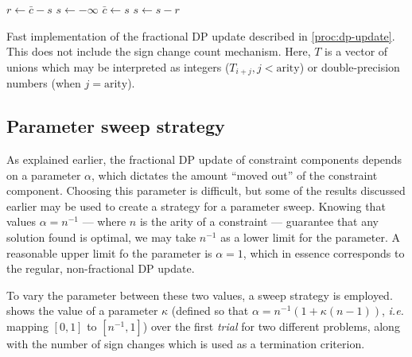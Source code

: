 \begin{algorithm}[tbp]
	\(r \leftarrow \bar{c} - s\) \;
	\(s \leftarrow -\infty\) \;
	\(\bar{c} \leftarrow s\) \;
	\(s \leftarrow s - r\) \;
	\caption{Fast implementation of the fractional DP update described in \cref{proc:dp-update}. This does not include the sign change count mechanism. Here, \(T\) is a vector of unions which may be interpreted as integers (\(T_{i+j}, j < \text{arity}\)) or double-precision numbers (when \(j = \text{arity}\)).}
	\label{alg:itm-maxsum-fast}
\end{algorithm}

\subsection{Parameter sweep strategy}
As explained earlier, the fractional DP update of constraint components depends on a parameter \(\alpha\), which dictates the amount \enquote{moved out} of the constraint component.
Choosing this parameter is difficult, but some of the results discussed earlier may be used to create a strategy for a parameter sweep.
Knowing that values \(\alpha=n^{-1}\) --- where \(n\) is the arity of a constraint --- guarantee that any solution found is optimal, we may take \(n^{-1}\) as a lower limit for the parameter.
A reasonable upper limit fo the parameter is \(\alpha=1\), which in essence corresponds to the regular, non-fractional DP update.

To vary the parameter between these two values, a sweep strategy is employed.
 shows the value of a parameter \(\kappa\) (defined so that \(\alpha = n^{-1}\left(1 + \kappa(n - 1)\right)\), \emph{i.e.} mapping \(\left[0,1\right]\) to \(\left[n^{-1},1\right]\)) over the first \emph{trial} for two different problems, along with the number of sign changes which is used as a termination criterion.

